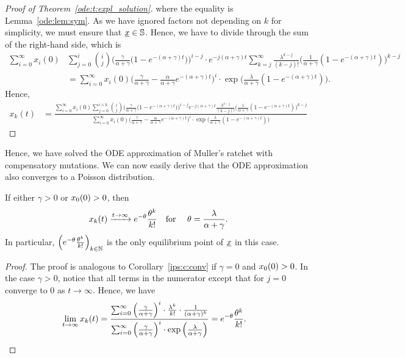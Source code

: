 \begin{proof}[Proof of Theorem~\ref{ode:t:expl_solution}]
\noindent
where the equality is Lemma~\ref{ode:lem:sym}. As we have ignored factors not depending on $k$ for
simplicity, we must ensure that $\underline{x} \in \mathbb{S}$. Hence, we have to divide through the sum
of the right-hand side, which is
{\small
\begin{align*}
  \sum_{i=0}^\infty x_i(0) & \sum_{j=0}^i \binom{i}{j}
  \Big(\frac{\gamma}{\alpha+\gamma}\big(
  1-e^{-(\alpha+\gamma)t}\big)\Big)^{i-j} \cdot e^{-j(\alpha+\gamma)t}
  \sum_{k=j}^\infty \frac{\lambda^{k-j}}{(k-j)!}  \Big(
  \frac{1}{\alpha+\gamma} (1-e^{-(\alpha+\gamma)t}) \Big)^{k-j} \\ & =
  \sum_{i=0}^\infty x_i(0) \Big(\frac{\gamma}{\alpha+\gamma} -
  \frac{\alpha}{\alpha+\gamma} e^{-(\alpha+\gamma)t}\Big)^i \cdot
  \exp\Big(\frac{\lambda}{\alpha+\gamma}(1-e^{-(\alpha+\gamma)t})
  \Big).
\end{align*}}
Hence, 
{\small
\begin{align*}
  x_k(t) & = \frac{ \sum_{i=0}^\infty x_i(0) \sum_{j=0}^{i\wedge k}
    \binom{i}{j} \Big(\frac{\gamma}{\alpha+\gamma}\big(
    1-e^{-(\alpha+\gamma)t}\big)\Big)^{i-j} 
    e^{-j(\alpha+\gamma)t} \frac{\lambda^{k-j}}{(k-j)!}
    \Big(\frac{1}{\alpha+\gamma} (1-e^{-(\alpha+\gamma)t})
    \Big)^{k-j}}{ \sum_{i=0}^\infty x_i(0)
    \Big(\frac{\gamma}{\alpha+\gamma} - \frac{\alpha}{\alpha+\gamma}
    e^{-(\alpha+\gamma)t}\Big)^i \cdot
    \exp\Big(\frac{\lambda}{\alpha+\gamma}(1-e^{-(\alpha+\gamma)t})
    \Big)}
\end{align*}}
\end{proof}

\noindent
Hence, we have solved the ODE approximation of Muller's ratchet with compensatory mutations. 
We can now easily derive that the ODE approximation also converges to a Poisson
distribution.

\begin{Corollary} \label{ode:c:conv_to_theta}
If either $\gamma > 0$ or $ x_{0} \! \left( 0 \right)  > 0$, then
\begin{align*} %
    \mrOdeKT{k}{t} \xrightarrow{t \to \infty} e^{-\theta} \frac{\theta^k}{k!} 
    \quad \text{for } \quad \theta = \frac{\lambda}{\alpha + \gamma}.
\end{align*}
In particular, $\left( e^{-\theta} \frac{\theta^k}{k!} \right)_{k \in \mathbb{N}}$ is
the only equilibrium point of $\underline{x}$ in this case.
\end{Corollary}
\begin{proof}
The proof is analogous to Corollary~\ref{ips:c:conv} if $\gamma = 0$ and
$ x_{0} \! \left( 0 \right)  > 0$. In the case $\gamma >0$, notice that all terms in the
numerator except that for $j = 0$ converge to $0$ as $t \to \infty$. Hence, we
have
\begin{align*}
\lim_{t \to \infty}  x_{k} \! \left( t \right)  
&= \frac{\sum_{i=0}^\infty \left(\frac{\gamma}{\alpha + \gamma}\right)^i \cdot
\frac{\lambda^k}{k!}
\cdot
\frac{1}{(\alpha + \gamma)^k}} {\sum_{i=0}^\infty \left(\frac{\gamma}{\alpha +
\gamma}\right)^i \cdot \exp\left( \frac{\lambda}{\alpha + \gamma} \right)}
= e^{-\theta} \frac{\theta^k}{k!}. \qedhere
\end{align*}
\end{proof}

